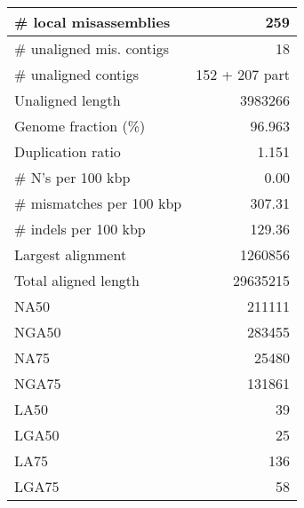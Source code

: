 \documentclass[12pt,a4paper]{article}
\begin{document}
\begin{table}[ht]
\begin{center}
\begin{tabular}{|l*{1}{|r}|}
\# local misassemblies & 259 \\ \hline
\# unaligned mis. contigs & 18 \\ \hline
\# unaligned contigs & 152 + 207 part \\ \hline
Unaligned length & 3983266 \\ \hline
Genome fraction (\%) & 96.963 \\ \hline
Duplication ratio & 1.151 \\ \hline
\# N's per 100 kbp & 0.00 \\ \hline
\# mismatches per 100 kbp & 307.31 \\ \hline
\# indels per 100 kbp & 129.36 \\ \hline
Largest alignment & 1260856 \\ \hline
Total aligned length & 29635215 \\ \hline
NA50 & 211111 \\ \hline
NGA50 & 283455 \\ \hline
NA75 & 25480 \\ \hline
NGA75 & 131861 \\ \hline
LA50 & 39 \\ \hline
LGA50 & 25 \\ \hline
LA75 & 136 \\ \hline
LGA75 & 58 \\ \hline
\end{tabular}
\end{center}
\end{table}
\end{document}
